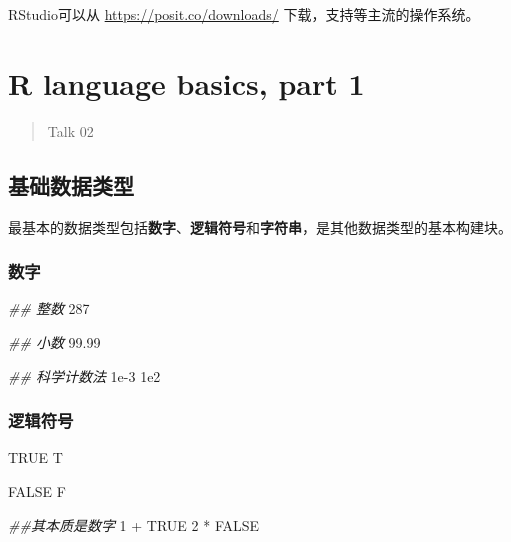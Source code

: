\documentclass[
]{article}
\newenvironment{Shaded}{}{}
\newcommand{\ConstantTok}[1]{\textcolor[rgb]{0.53,0.00,0.00}{#1}}
\newcommand{\DecValTok}[1]{\textcolor[rgb]{0.25,0.63,0.44}{#1}}
\newcommand{\DocumentationTok}[1]{\textcolor[rgb]{0.73,0.13,0.13}{\textit{#1}}}
\newcommand{\FloatTok}[1]{\textcolor[rgb]{0.25,0.63,0.44}{#1}}
\newcommand{\NormalTok}[1]{#1}
\newcommand{\SpecialCharTok}[1]{\textcolor[rgb]{0.25,0.44,0.63}{#1}}
\begin{document}
RStudio可以从 \url{https://posit.co/downloads/}
下载，支持等主流的操作系统。

\hypertarget{r-language-basics-part-1}{%
\section{R language basics, part 1}\label{r-language-basics-part-1}}

\begin{quote}
Talk 02
\end{quote}

\hypertarget{ux57faux7840ux6570ux636eux7c7bux578b}{%
\subsection{基础数据类型}\label{ux57faux7840ux6570ux636eux7c7bux578b}}

最基本的数据类型包括\textbf{数字}、\textbf{逻辑符号}和\textbf{字符串}，是其他数据类型的基本构建块。

\hypertarget{ux6570ux5b57}{%
\subsubsection{\texorpdfstring{数字 }{数字 }}\label{ux6570ux5b57}}

\begin{Shaded}
\begin{Highlighting}[]
\DocumentationTok{\#\# 整数}
\DecValTok{287}

\DocumentationTok{\#\# 小数}
\FloatTok{99.99}

\DocumentationTok{\#\# 科学计数法}
\FloatTok{1e{-}3}
\FloatTok{1e2}
\end{Highlighting}
\end{Shaded}

\hypertarget{ux903bux8f91ux7b26ux53f7}{%
\subsubsection{逻辑符号}\label{ux903bux8f91ux7b26ux53f7}}

\begin{Shaded}
\begin{Highlighting}[]
\ConstantTok{TRUE}
\NormalTok{T}

\ConstantTok{FALSE}
\NormalTok{F}

\DocumentationTok{\#\#其本质是数字}
\DecValTok{1} \SpecialCharTok{+} \ConstantTok{TRUE}
\DecValTok{2} \SpecialCharTok{*} \ConstantTok{FALSE}
\end{Highlighting}
\end{Shaded}
\end{document}
